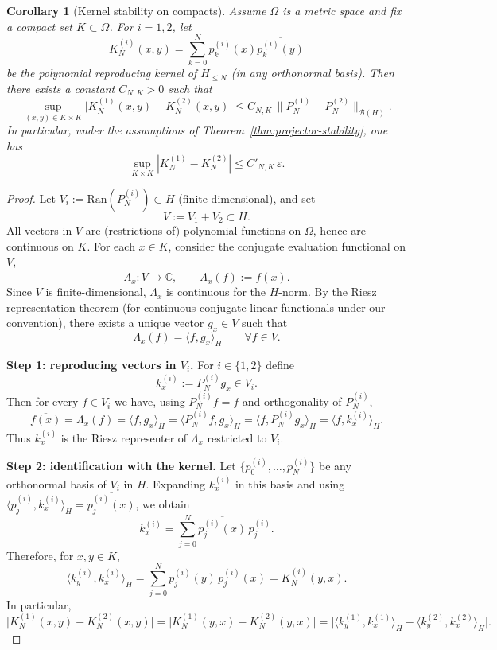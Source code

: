 \documentclass[10pt,a4paper]{amsart}
\newtheorem{corollary}{Corollary}
\begin{document}
\begin{corollary}[Kernel stability on compacts]\label{cor:kernel-stability}
Assume $\Omega$ is a metric space and fix a compact set $K\subset\Omega$.
For $i=1,2$, let
\[
K_N^{(i)}(x,y)=\sum_{k=0}^N p_k^{(i)}(x)\overline{p_k^{(i)}(y)}
\]
be the polynomial reproducing kernel of $H_{\le N}$ (in any orthonormal basis).
Then there exists a constant $C_{N,K}>0$ such that
\[
\sup_{(x,y)\in K\times K}\big|K_N^{(1)}(x,y)-K_N^{(2)}(x,y)\big|
\le C_{N,K}\,\|P_N^{(1)}-P_N^{(2)}\|_{\mathcal B(H)}.
\]
In particular, under the assumptions of Theorem~\ref{thm:projector-stability}, one has
\[
\sup_{K\times K}|K_N^{(1)}-K_N^{(2)}|\le C'_{N,K}\,\varepsilon.
\]
\end{corollary}

\begin{proof}
Let $V_i:=\mathrm{Ran}(P_N^{(i)})\subset H$ (finite-dimensional), and set
\[
V:=V_1+V_2\subset H.
\]
All vectors in $V$ are (restrictions of) polynomial functions on $\Omega$, hence are continuous on $K$.
For each $x\in K$, consider the conjugate evaluation functional on $V$,
\[
\Lambda_x:V\to\mathbb C,\qquad \Lambda_x(f):=\overline{f(x)}.
\]
Since $V$ is finite-dimensional, $\Lambda_x$ is continuous for the $H$-norm.
By the Riesz representation theorem (for continuous conjugate-linear functionals under our convention),
there exists a unique vector $g_x\in V$ such that
\begin{equation}\label{eq:Riesz-gx}
\Lambda_x(f)=\langle f,g_x\rangle_H\qquad\forall f\in V.
\end{equation}

\smallskip
\noindent\textbf{Step 1: reproducing vectors in $V_i$.}
For $i\in\{1,2\}$ define
\[
k_x^{(i)}:=P_N^{(i)}g_x\in V_i.
\]
Then for every $f\in V_i$ we have, using $P_N^{(i)}f=f$ and orthogonality of $P_N^{(i)}$,
\[
\overline{f(x)}=\Lambda_x(f)=\langle f,g_x\rangle_H=\langle P_N^{(i)}f,g_x\rangle_H
=\langle f,P_N^{(i)}g_x\rangle_H=\langle f,k_x^{(i)}\rangle_H.
\]
Thus $k_x^{(i)}$ is the Riesz representer of $\Lambda_x$ restricted to $V_i$.

\smallskip
\noindent\textbf{Step 2: identification with the kernel.}
Let $\{p_0^{(i)},\dots,p_N^{(i)}\}$ be any orthonormal basis of $V_i$ in $H$.
Expanding $k_x^{(i)}$ in this basis and using $\langle p_j^{(i)},k_x^{(i)}\rangle_H=\overline{p_j^{(i)}(x)}$,
we obtain
\begin{equation}\label{eq:kx-expansion}
k_x^{(i)}=\sum_{j=0}^N \overline{p_j^{(i)}(x)}\,p_j^{(i)}.
\end{equation}
Therefore, for $x,y\in K$,
\[
\langle k_y^{(i)},k_x^{(i)}\rangle_H
=\sum_{j=0}^N p_j^{(i)}(y)\,\overline{p_j^{(i)}(x)}
=K_N^{(i)}(y,x).
\]
In particular,
\begin{equation}\label{eq:kernel-via-k}
\big|K_N^{(1)}(x,y)-K_N^{(2)}(x,y)\big|
=\big|K_N^{(1)}(y,x)-K_N^{(2)}(y,x)\big|
=\big|\langle k_y^{(1)},k_x^{(1)}\rangle_H-\langle k_y^{(2)},k_x^{(2)}\rangle_H\big|.
\end{equation}


\end{proof}
\end{document}
